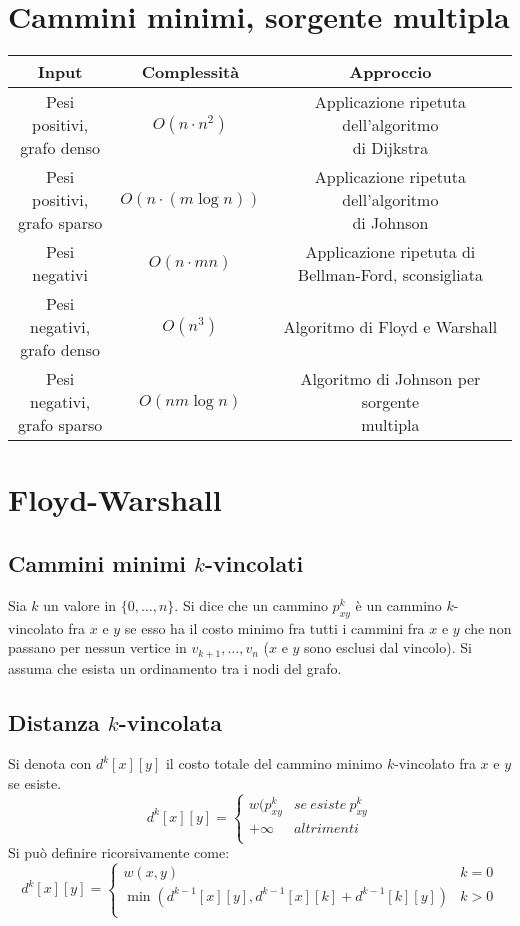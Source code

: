 \section{Cammini minimi, sorgente multipla}
\begin{tabular}{|c|c|c|}
	\hline
	\textbf{Input} & \textbf{Complessit\`a} & \textbf{Approccio}\\
	\hline
	\makecell{Pesi positivi, \\ grafo denso} & $O(n\cdot n^2)$ & \makecell{Applicazione ripetuta dell'algoritmo \\ di Dijkstra}\\
	\hline
	\makecell{Pesi positivi, \\ grafo sparso}  & $O(n\cdot (m\log n))$ & \makecell{Applicazione ripetuta dell'algoritmo \\ di Johnson}\\
	\hline
	Pesi negativi & $O(n\cdot mn)$ & \makecell{Applicazione ripetuta di \\ Bellman-Ford, sconsigliata}\\
	\hline
	\makecell{Pesi negativi, \\ grafo denso} & $O(n^3)$ & Algoritmo di Floyd e Warshall\\
	\hline
	\makecell{Pesi negativi, \\ grafo sparso} & $O(nm\log n)$ & \makecell{Algoritmo di Johnson per sorgente \\ multipla}\\
	\hline
\end{tabular}
\section{Floyd-Warshall}
\subsection{Cammini minimi $k$-vincolati}
Sia $k$ un valore in $\{0, \dots, n\}$. Si dice che un cammino $p^k_{xy}$ \`e un cammino $k$-vincolato fra $x$ e $y$ se esso ha il costo minimo fra tutti i cammini fra $x$ e $y$ che non 
passano per nessun vertice in $v_{k+1}, \dots, v_n$ ($x$ e $y$ sono esclusi dal vincolo). Si assuma che esista un ordinamento tra i nodi del grafo.
\subsection{Distanza $k$-vincolata}
Si denota con $d^k[x][y]$ il costo totale del cammino minimo $k$-vincolato fra $x$ e $y$ se esiste.
$$ d^k[x][y] = \begin{cases}
	w(p^k_{xy} & se\ esiste\ p^k_{xy}\\
	+\infty & altrimenti\\
\end{cases}$$
Si pu\`o definire ricorsivamente come:
$$ d^k[x][y] = \begin{cases}
	w(x, y) & k = 0\\
	\min(d^{k-1}[x][y], d^{k-1}[x][k]+d^{k-1}[k][y]) & k>0\\
\end{cases}$$

